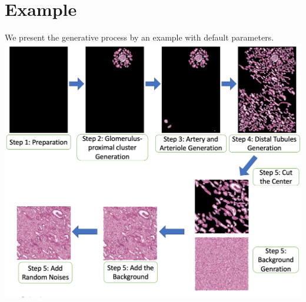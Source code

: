 \documentclass{article}
\begin{document}
\section{Example}
We present the generative process by an example with default parameters.\\
\includegraphics[scale=0.5]{./collage_generator_example.png}
 
\end{document}
